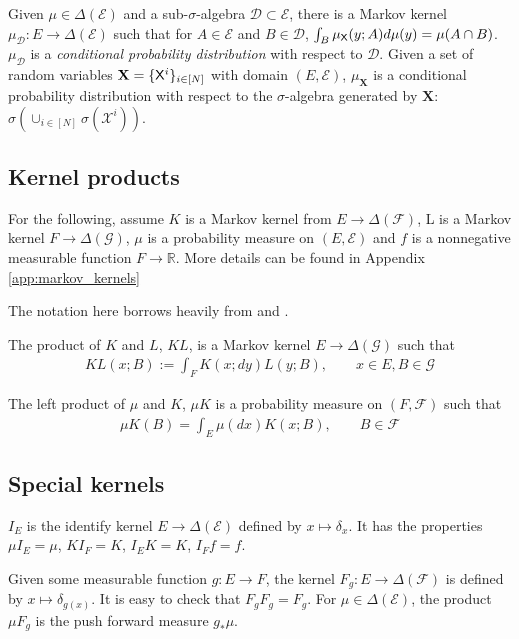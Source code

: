 Given $\mu\in \Delta(\mathcal{E})$ and a sub-$\sigma$-algebra $\mathcal{D}\subset\mathcal{E}$, there is a Markov kernel $\mu_{\mathcal{D}}:E\to\Delta(\mathcal{E})$ such that for $A\in\mathcal{E}$ and $B\in \mathcal{D}$, $\int_B \mu_{\mathsf{X}}(y;A) d\mu(y) = \mu(A\cap B)$. $\mu_{\mathcal{D}}$ is a \emph{conditional probability distribution} with respect to $\mathcal{D}$. Given a set of random variables $\mathbf{X}=\{\mathsf{X}^i\}_{i\in [N]}$ with domain $(E,\mathcal{E})$, $\mu_{\mathbf{X}}$ is a conditional probability distribution with respect to the $\sigma$-algebra generated by $\mathbf{X}$: $\sigma(\cup_{i\in[N]}\sigma(\mathcal{X}^i))$.

\subsection{Kernel products}

For the following, assume $K$ is a Markov kernel from $E\to \Delta(\mathcal{F})$, L is a Markov kernel $F\to \Delta(\mathcal{G})$, $\mu$ is a probability measure on $(E,\mathcal{E})$ and $f$ is a nonnegative measurable function $F\to \mathbb{R}$. More details can be found in Appendix \ref{app:markov_kernels}

The notation here borrows heavily from \cite{cinlar_probability_2011} and \cite{fong_causal_2013}.



The product of $K$ and $L$, $KL$, is a Markov kernel $E\to \Delta(\mathcal{G})$ such that
\begin{align}
    KL(x;B):= \int_F K(x;dy) L(y;B),\qquad x\in E, B\in \mathcal{G}
\end{align}

The left product of $\mu$ and $K$, $\mu K$ is a probability measure on $(F,\mathcal{F})$ such that
\begin{align}
    \mu K(B)=\int_E \mu(dx) K(x;B),\qquad B\in\mathcal{F}
\end{align}

\subsection{Special kernels}

$I_E$ is the identify kernel $E\to \Delta(\mathcal{E})$ defined by $x\mapsto \delta_x$. It has the properties $\mu I_E=\mu$, $KI_F = K$, $I_E K = K$, $I_F f=f$.

Given some measurable function $g:E\to F$, the kernel $F_g:E\to \Delta(\mathcal{F})$ is defined by $x\mapsto \delta_{g(x)}$. It is easy to check that $F_g F_g = F_g$. For $\mu\in \Delta(\mathcal{E})$, the product $\mu F_g$ is the push forward measure $g_*\mu$. 

